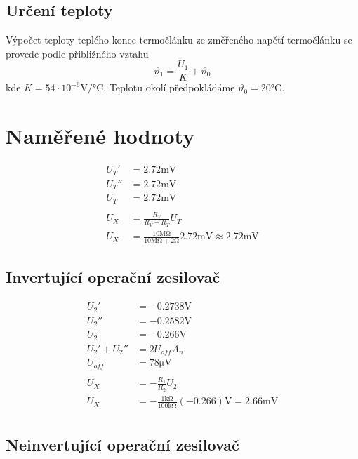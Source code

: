 \documentclass{article}
\begin{document}
\subsection{Určení teploty}
Výpočet teploty teplého konce termočlánku ze změřeného napětí termočlánku se provede podle přibližného vztahu
\begin{equation}
    \vartheta_1=\frac{U_1}{K}+\vartheta_0
\end{equation}
kde $K = 54 \cdot 10^{-6} \si{\volt\per\degreeCelsius}$. Teplotu okolí předpokládáme $\vartheta_0 = 20 \si{\degreeCelsius}$.

\section{Naměřené hodnoty}
$$
\begin{aligned}
	U_T' &= 2.72 \si{\milli\volt}\\
	U_T'' &= 2.72 \si{\milli\volt}\\
	U_T &= 2.72 \si{\milli\volt}\\
	\\
	U_X &= \frac{R_V}{R_V+R_T}U_T\\
	U_X &= \frac{10 \si{\mega\ohm}}{10 \si{\mega\ohm} + 2\si{\ohm}}2.72 \si{\milli\volt} \approx 2.72 \si{\milli\volt}
\end{aligned}
$$

\subsection{Invertující operační zesilovač}

$$
\begin{aligned}
	U_2' &= -0.2738 \si{\volt}\\
	U_2'' &= -0.2582 \si{\volt}\\
	U_2 &= -0.266 \si{\volt}
	\\
	U_2'+U_2'' &= 2U_{off}A_n\\
	U_{off} &= 78 \si{\micro\volt}\\
	\\
	U_X &= -\frac{R_1}{R_2}U_2\\
	U_X &= -\frac{1\si{\kilo\ohm}}{100\si{\kilo\ohm}}(-0.266) \si{\volt} = 2.66 \si{\milli\volt}\\
\end{aligned}
$$

\subsection{Neinvertující operační zesilovač}
\end{document}
